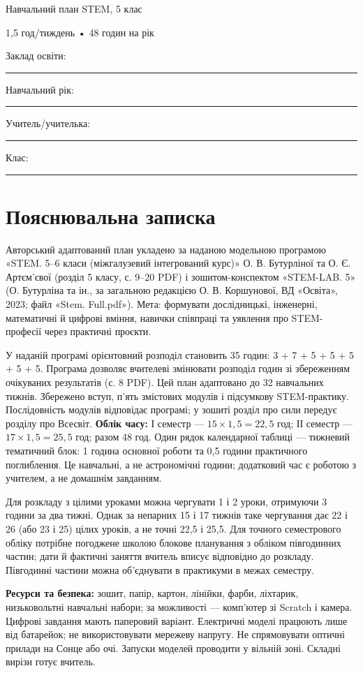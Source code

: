 \documentclass[10pt,a4paper,landscape]{article}
\begin{document}
{\LARGE\color{accent} Навчальний план STEM, 5 клас}

{\large 1,5 год/тиждень • 48 годин на рік}

Заклад освіти: \rule{90mm}{0.3pt}\quad Навчальний рік: \rule{30mm}{0.3pt}

Учитель/учителька: \rule{95mm}{0.3pt}\quad Клас: \rule{25mm}{0.3pt}
\section*{Пояснювальна записка}
Авторський адаптований план укладено за наданою модельною програмою «STEM. 5--6 класи (міжгалузевий інтегрований курс)» О. В. Бутурліної та О. Є. Артєм’євої (розділ 5 класу, с. 9--20 PDF) і зошитом-конспектом «STEM-LAB. 5» (О. Бутурліна та ін., за загальною редакцією О. В. Коршунової, ВД «Освіта», 2023; файл «Stem. Full.pdf»).
Мета: формувати дослідницькі, інженерні, математичні й цифрові вміння, навички співпраці та уявлення про STEM-професії через практичні проєкти.

У наданій програмі орієнтовний розподіл становить 35 годин: 3 + 7 + 5 + 5 + 5 + 5 + 5. Програма дозволяє вчителеві змінювати розподіл годин зі збереженням очікуваних результатів (с. 8 PDF). Цей план адаптовано до 32 навчальних тижнів. Збережено вступ, п’ять змістових модулів і підсумкову STEM-практику. Послідовність модулів відповідає програмі; у зошиті розділ про сили передує розділу про Всесвіт.
\textbf{Облік часу:} І семестр — $15\times1{,}5=22{,}5$ год; ІІ семестр — $17\times1{,}5=25{,}5$ год; разом 48 год. Один рядок календарної таблиці — тижневий тематичний блок: 1 година основної роботи та 0,5 години практичного поглиблення. Це навчальні, а не астрономічні години; додатковий час є роботою з учителем, а не домашнім завданням.

Для розкладу з цілими уроками можна чергувати 1 і 2 уроки, отримуючи 3 години за два тижні. Однак за непарних 15 і 17 тижнів таке чергування дає 22 і 26 (або 23 і 25) цілих уроків, а не точні 22,5 і 25,5. Для точного семестрового обліку потрібне погоджене школою блокове планування з обліком півгодинних частин; дати й фактичні заняття вчитель вписує відповідно до розкладу. Півгодинні частини можна об’єднувати в практикуми в межах семестру.

\textbf{Ресурси та безпека:} зошит, папір, картон, лінійки, фарби, ліхтарик, низьковольтні навчальні набори; за можливості — комп’ютер зі Scratch і камера. Цифрові завдання мають паперовий варіант. Електричні моделі працюють лише від батарейок; не використовувати мережеву напругу. Не спрямовувати оптичні прилади на Сонце або очі. Запуски моделей проводити у вільній зоні. Складні вирізи готує вчитель.
\end{document}
